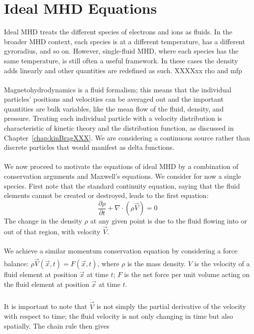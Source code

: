 \section{Ideal MHD Equations}
Ideal MHD treats the different species of electrons and ions as fluids. In the broader MHD context, each species is at a different temperature, has a different gyroradius, and so on. However, single-fluid MHD, where each species has the same temperature, is still often a useful framework. In these cases the density adds linearly and other quantities are redefined as such. XXXXxx
rho and mfp\\
\\
Magnetohydrodynamics is a fluid formalism; this means that the individual particles' positions and velocities can be averaged out and the important quantities are bulk variables, like the mean flow of the fluid, density, and pressure. Treating each individual particle with a velocity distribution is characteristic of kinetic theory and the distribution function, as discussed in Chapter~\ref{chap:kinBragXXX}. We are considering a continuous source rather than discrete particles that would manifest as delta functions. \\
\\
We now proceed to motivate the equations of ideal MHD by a combination of conservation arguments and Maxwell's equations. We consider for now a single species. First note that the standard continuity equation, saying that the fluid elements cannot be created or destroyed, leads to the first equation:
\begin{equation}
  \frac{\partial\rho}{\partial t}+\nabla\cdot\left(\rho\vec V\right)=0\label{eq:continuity}
\end{equation}
The change in the density $\rho$ at any given point is due to the fluid flowing into or out of that region, with velocity $\vec V$. \\
\\
We achieve a similar momentum conservation equation by considering a force balance: $\rho \dot{\vec V}(\vec x,t)=F(\vec x,t)$, where $\rho$ is the mass density. $V$ is the velocity of a fluid element at position $\vec x$ at time $t$; $F$ is the net force per unit volume acting on the fluid element at position $\vec x$ at time $t$.\\
  \\
  It is important to note that $\dot{\vec V}$ is not simply the partial derivative of the velocity with respect to time; the fluid velocity is not only changing in time but also spatially. The chain rule then gives
